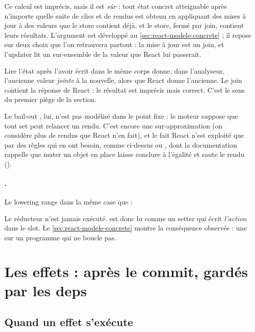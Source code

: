 Ce calcul est imprécis, mais il est \emph{sûr} : tout état concret
atteignable après n'importe quelle suite de clics et de rendus est obtenu en
appliquant des mises à jour à des valeurs que le store contient déjà, et le
store, fermé par join, contient leurs résultats. L'argument est développé au
\cref{sec:react-modele-concrete} ; il repose sur deux choix que l'on retrouvera
partout : la mise à jour est un join, et l'updater lit un sur-ensemble de la
valeur que React lui passerait.

\begin{remarque}
Lire l'état après l'avoir écrit dans le même corps donne, dans l'analyseur,
l'ancienne valeur \emph{jointe} à la nouvelle, alors que React donne
l'ancienne. Le join contient la réponse de React : le résultat est imprécis
mais correct. C'est le sens du premier piège de la section.
\end{remarque}

Le bail-out , lui, n'est pas modélisé dans le point fixe : le
moteur suppose que tout set peut relancer un rendu. C'est encore une
sur-approximation (on considère plus de rendus que React n'en fait), et le fait
React n'est exploité que par des règles qui en ont besoin, comme
 ci-dessus ou , dont la
documentation rappelle que muter un objet en place laisse 
conclure à l'égalité et saute le rendu
().

\paragraph{.} Le lowering range  dans la même
case que  :


Le réducteur n'est jamais exécuté.  est donc lu comme un
setter qui écrit \emph{l'action} dans le slot. Le \cref{sec:react-modele-concrete}
montre la conséquence observée : une \Error{} sur un programme qui ne boucle
pas.

\section{Les effets : après le commit, gardés par les deps}
\label{sec:react-modele-effets}

\subsection{Quand un effet s'exécute}

